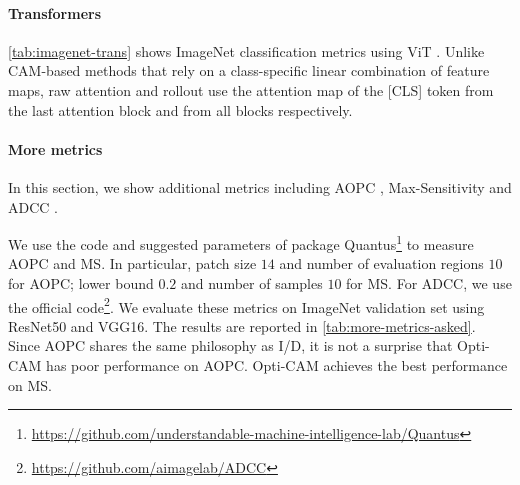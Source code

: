 

\paragraph{Transformers}

\autoref{tab:imagenet-trans} shows ImageNet classification metrics using ViT . 
Unlike CAM-based methods that rely on a class-specific linear combination of feature maps, 
raw attention \autocite{dosovitskiy2020image} and rollout \autocite{abnar2020quantifying} use the 
attention map of the [CLS] token from the last attention block and from all blocks respectively. 

\paragraph{More metrics}
In this section, we show additional metrics including AOPC \autocite{samek2016evaluating}, Max-Sensitivity
 \autocite{yeh2019fidelity} and ADCC \autocite{poppi2021revisiting}.

We use the code and suggested parameters of package 
Quantus\footnote{\url{https://github.com/understandable-machine-intelligence-lab/Quantus}} to measure AOPC 
and MS. In particular, patch size $14$ and number of evaluation regions $10$ for AOPC; lower bound $0.2$ 
and number of samples $10$ for MS.
For ADCC, we use the official 
code\footnote{\url{https://github.com/aimagelab/ADCC}}.
We evaluate these metrics on ImageNet validation set using ResNet50 and VGG16. The results are 
reported in \autoref{tab:more-metrics-asked}. Since AOPC shares the same philosophy as I/D, it is 
not a surprise that Opti-CAM has poor performance on AOPC. Opti-CAM achieves the best performance on MS.


